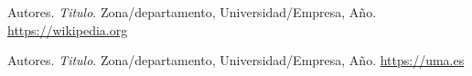 
\begin{thebibliography}{9}
    Autores.
    \textit{Titulo}. Zona/departamento, Universidad/Empresa, Año.
    \url{https://wikipedia.org}

    Autores.
    \textit{Titulo}. Zona/departamento, Universidad/Empresa, Año.
    \url{https://uma.es}

\end{thebibliography}